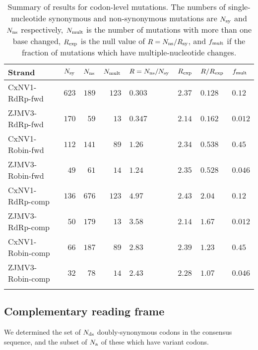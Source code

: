 \documentclass[unnumsec,webpdf,contemporary,large]{oup-authoring-template}%
\theoremstyle{thmstyleone}%
\theoremstyle{thmstyletwo}%
\theoremstyle{thmstylethree}%
\begin{document}
\begin{table*}
\caption{
Summary of results for codon-level mutations.
The numbers of single-nucleotide synonymous and
non-synonymous mutations are $N_{\rm sy}$ and $N_{\rm ns}$ respectively, $N_{\rm mult}$ is the number
of mutations with more than one base changed, $R_{\rm exp}$ is the null value of $R=N_{\rm ns}/R_{\rm sy}$,
and $f_{\rm mult}$ if the fraction of mutations which have multiple-nucleotide changes.
\label{tab: 5.2}}
\begin{tabular*}{\textwidth}{@{\extracolsep\fill}lrrrllll@{\extracolsep\fill}}
\toprule
Strand&$N_{\rm sy}$&$N_{\rm ns}$&$N_{\rm mult}$&$R=N_{\rm ns}/N_{\rm sy}$&$R_{\rm exp}$
&$R/R_{\rm exp}$&$f_{\rm mult}$\\
\midrule
CxNV1-RdRp-fwd   &$623$ &$189$ & $123$ &$0.303$ &$2.37$&$0.128$&$0.12$\\
ZJMV3-RdRp-fwd   &$170$ &$59$ & $13$ &$0.347$ &$2.14$&$0.162$&$0.012$\\
CxNV1-Robin-fwd   &$112$&$141$& $89$   &$1.26$ & $2.34$&$0.538$&$0.45$\\
ZJMV3-Robin-fwd   &$49$&$61$& $14$   &$1.24$ & $2.35$&$0.528$&$0.046$\\
CxNV1-RdRp-comp &$136$&$676$& $123$ &$4.97$ &$2.43$&$2.04$&$0.12$\\
ZJMV3-RdRp-comp &$50$&$179$& $13$ &$3.58$ &$2.14$&$1.67$&$0.012$\\
CxNV1-Robin-comp &$66$&$187$&$89$&$2.83$&$2.39$&$1.23$&$0.45$\\
ZJMV3-Robin-comp &$32$&$78$&$14$&$2.43$&$2.28$&$1.07$&$0.046$\\
\botrule
\end{tabular*}
\end{table*}

\subsection{{\bf Complementary reading frame}}
\label{sec: 5.2}

We determined the set of $N_{\rm ds}$ doubly-synonymous codons in the consensus sequence, and
the subset of $N_{\rm a}$ of these which have variant codons.
\end{document}
